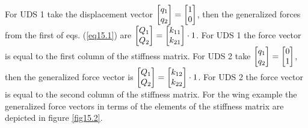 \documentclass{AeroStructure-ERJohnson}
\begin{document}
\noindent For UDS 1 take the displacement vector $\left[\begin{array}{@{}l@{}}q_{1} \\q_{2}\end{array}\right]=\left[\begin{array}{@{}l@{}}1 \\0\end{array}\right]$, then the generalized forces from the first of eqs. (\ref{eq15.1}) are $\left[\begin{array}{@{}l@{}}Q_{1} \\Q_{2}\end{array}\right]=\left[\begin{array}{@{}l@{}}k_{11} \\k_{21}\end{array}\right] \cdot 1$. For UDS 1 the force vector is equal to the first column of the stiffness matrix. For UDS 2 take $\left[\begin{array}{@{}l@{}}q_{1} \\q_{2}\end{array}\right]=\left[\begin{array}{@{}l@{}}0 \\1\end{array}\right]$, then the generalized force vector is $\left[\begin{array}{@{}l@{}}Q_{1} \\Q_{2}\end{array}\right]=\left[\begin{array}{@{}l@{}}k_{12} \\k_{22}\end{array}\right] \cdot 1$. For UDS 2 the force vector is equal to the second column of the stiffness matrix. For the wing example the generalized force vectors in terms of the elements of the stiffness matrix are depicted in figure \ref{fig15.2}.

{\def\thefigure{15.2}
}
\end{document}
